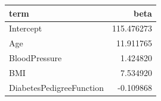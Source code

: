 \begin{tabular}{lr}
\toprule
term & beta \\
\midrule
Intercept & 115.476273 \\
Age & 11.911765 \\
BloodPressure & 1.424820 \\
BMI & 7.534920 \\
DiabetesPedigreeFunction & -0.109868 \\
\bottomrule
\end{tabular}
